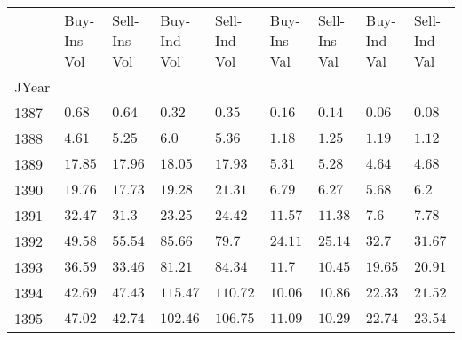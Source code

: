 \begin{tabular}{lllllllll}
    \toprule
          & Buy-Ins-Vol         & Sell-Ins-Vol        & Buy-Ind-Vol         & Sell-Ind-Vol        & Buy-Ins-Val         & Sell-Ins-Val        & Buy-Ind-Val          & Sell-Ind-Val         \\
    JYear &                     &                     &                     &                     &                     &                     &                      &                      \\
    \midrule
    1387  & \(\mathrm{0.68}\)   & \(\mathrm{0.64}\)   & \(\mathrm{0.32}\)   & \(\mathrm{0.35}\)   & \(\mathrm{0.16}\)   & \(\mathrm{0.14}\)   & \(\mathrm{0.06}\)    & \(\mathrm{0.08}\)    \\
    1388  & \(\mathrm{4.61}\)   & \(\mathrm{5.25}\)   & \(\mathrm{6.0}\)    & \(\mathrm{5.36}\)   & \(\mathrm{1.18}\)   & \(\mathrm{1.25}\)   & \(\mathrm{1.19}\)    & \(\mathrm{1.12}\)    \\
    1389  & \(\mathrm{17.85}\)  & \(\mathrm{17.96}\)  & \(\mathrm{18.05}\)  & \(\mathrm{17.93}\)  & \(\mathrm{5.31}\)   & \(\mathrm{5.28}\)   & \(\mathrm{4.64}\)    & \(\mathrm{4.68}\)    \\
    1390  & \(\mathrm{19.76}\)  & \(\mathrm{17.73}\)  & \(\mathrm{19.28}\)  & \(\mathrm{21.31}\)  & \(\mathrm{6.79}\)   & \(\mathrm{6.27}\)   & \(\mathrm{5.68}\)    & \(\mathrm{6.2}\)     \\
    1391  & \(\mathrm{32.47}\)  & \(\mathrm{31.3}\)   & \(\mathrm{23.25}\)  & \(\mathrm{24.42}\)  & \(\mathrm{11.57}\)  & \(\mathrm{11.38}\)  & \(\mathrm{7.6}\)     & \(\mathrm{7.78}\)    \\
    1392  & \(\mathrm{49.58}\)  & \(\mathrm{55.54}\)  & \(\mathrm{85.66}\)  & \(\mathrm{79.7}\)   & \(\mathrm{24.11}\)  & \(\mathrm{25.14}\)  & \(\mathrm{32.7}\)    & \(\mathrm{31.67}\)   \\
    1393  & \(\mathrm{36.59}\)  & \(\mathrm{33.46}\)  & \(\mathrm{81.21}\)  & \(\mathrm{84.34}\)  & \(\mathrm{11.7}\)   & \(\mathrm{10.45}\)  & \(\mathrm{19.65}\)   & \(\mathrm{20.91}\)   \\
    1394  & \(\mathrm{42.69}\)  & \(\mathrm{47.43}\)  & \(\mathrm{115.47}\) & \(\mathrm{110.72}\) & \(\mathrm{10.06}\)  & \(\mathrm{10.86}\)  & \(\mathrm{22.33}\)   & \(\mathrm{21.52}\)   \\
    1395  & \(\mathrm{47.02}\)  & \(\mathrm{42.74}\)  & \(\mathrm{102.46}\) & \(\mathrm{106.75}\) & \(\mathrm{11.09}\)  & \(\mathrm{10.29}\)  & \(\mathrm{22.74}\)   & \(\mathrm{23.54}\)   \\

\end{tabular}
